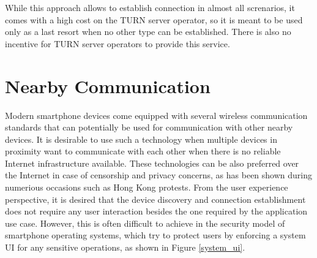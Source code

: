 While this approach allows to establish connection in almost all screnarios, it comes with a high cost on the TURN server operator, so it is meant to be used only as a last resort when no other type can be established. There is also no incentive for TURN server operators to provide this service.





\section{Nearby Communication}

Modern smartphone devices come equipped with several wireless communication standards that can potentially be used for communication with other nearby devices. It is desirable to use such a technology when multiple devices in proximity want to communicate with each other when there is no reliable Internet infrastructure available. These technologies can be also preferred over the Internet in case of censorship and privacy concerns, as has been shown during numerious occasions such as Hong Kong protests. From the user experience perspective, it is desired that the device discovery and connection establishment does not require any user interaction besides the one required by the application use case. However, this is often difficult to achieve in the security model of smartphone operating systems, which try to protect users by enforcing a system UI for any sensitive operations, as shown in Figure \ref{system_ui}.

